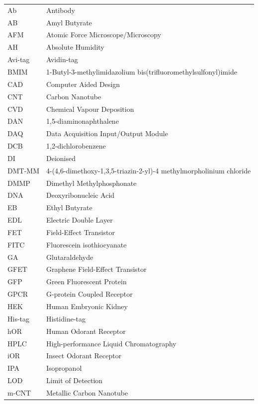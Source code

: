 \documentclass[
  a4paper,
]{scrbook}
\begin{document}
\begin{table}[h]
  \begin{tabular}{@{}p{} p{}@{}}  %
    Ab  & Antibody  \\
    AB  & Amyl Butyrate  \\
    AFM  & Atomic Force Microscope/Microscopy  \\
    AH  & Absolute Humidity  \\
    Avi-tag  & Avidin-tag  \\
    BMIM  & 1-Butyl-3-methylimidazolium bis(trifluoromethylsulfonyl)imide  \\
    CAD  & Computer Aided Design \\
    CNT  & Carbon Nanotube  \\
    CVD  & Chemical Vapour Deposition  \\
    DAN  & 1,5-diaminonaphthalene  \\
    DAQ  & Data Acquisition Input/Output Module  \\
    DCB  & 1,2-dichlorobenzene  \\
    DI  & Deionised  \\
    DMT-MM   & 4-(4,6-dimethoxy-1,3,5-triazin-2-yl)-4 methylmorpholinium chloride \\
    DMMP  & Dimethyl Methylphosphonate  \\
    DNA  & Deoxyribonucleic Acid  \\
    EB  & Ethyl Butyrate  \\
    EDL  & Electric Double Layer  \\
    FET  & Field-Effect Transistor  \\
    FITC  & Fluorescein isothiocyanate  \\
    GA  & Glutaraldehyde  \\
    GFET  & Graphene Field-Effect Transistor  \\
    GFP  & Green Fluorescent Protein  \\
    GPCR  & G-protein Coupled Receptor  \\
    HEK  & Human Embryonic Kidney  \\
    His-tag  & Histidine-tag  \\
    hOR  & Human Odorant Receptor  \\
    HPLC  & High-performance Liquid Chromatography   \\
    iOR  & Insect Odorant Receptor  \\
    IPA  & Isopropanol  \\
    LOD  & Limit of Detection  \\
    m-CNT  & Metallic Carbon Nanotube   \\
  \end{tabular}
\end{table}
\end{document}
